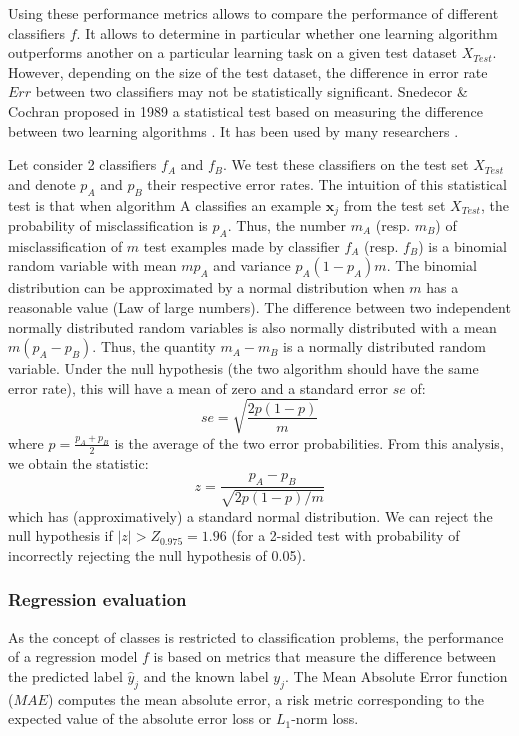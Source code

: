 Using these performance metrics allows to compare the performance of different classifiers $f$. It allows to determine in particular whether one learning algorithm outperforms another on a particular learning task on a given test dataset $X_{Test}$. However, depending on the size of the test dataset, the difference in error rate $Err$ between two classifiers may not be statistically significant. Snedecor \& Cochran proposed in 1989 a statistical test based on measuring the difference between two learning algorithms \cite{Cochran1977}. It has been used by many researchers \cite{Dietterich1997,Dietterich1995}.

Let consider 2 classifiers $f_A$ and $f_B$. We test these classifiers on the test set $X_{Test}$ and denote $p_A$ and $p_B$ their respective error rates. The intuition of this statistical test is that when algorithm A classifies an example $\textbf{x}_j$ from the test set $X_{Test}$, the probability of misclassification is $p_A$. Thus, the number $m_A$ (resp. $m_B$) of misclassification of $m$ test examples made by classifier $f_A$ (resp. $f_B$) is a binomial random variable with mean $mp_A$ and variance $p_A(1-p_A)m$. The binomial distribution can be approximated by a normal distribution when $m$ has a reasonable value (Law of large numbers). The difference between two independent normally distributed random variables is also normally distributed with a mean $m(p_A-p_B)$. Thus, the quantity $m_A-m_B$ is a normally distributed random variable. Under the null hypothesis (the two algorithm should have the same error rate), this will have a mean of zero and a standard error $se$ of:
\begin{equation}
se = \sqrt{\frac{2p(1-p)}{m}}
\end{equation}
\noindent where $p=\frac{p_A+p_B}{2}$ is the average of the two error probabilities. From this analysis, we obtain the statistic:
\begin{equation}
z=\frac{p_A-p_B}{\sqrt{2p(1-p)/m}}
\end{equation}
\noindent which has (approximatively) a standard normal distribution. We can reject the null hypothesis if $|z| > Z_{0.975} = 1.96$ (for a 2-sided test with probability of incorrectly rejecting the null hypothesis of 0.05).


\subsubsection{Regression evaluation}
As the concept of classes is restricted to classification problems, the performance of a regression model $f$ is based on metrics that measure the difference between the predicted label $\hat{y}_j$ and the known label $y_j$. The Mean Absolute Error function ($MAE$) computes the mean absolute error, a risk metric corresponding to the expected value of the absolute error loss or $L_1$-norm loss.

